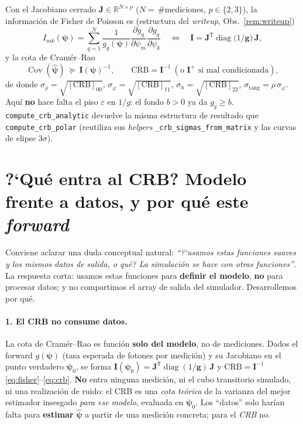 \documentclass[11pt,a4paper]{article}
\theoremstyle{plain}
\theoremstyle{definition}
\newcommand{\vect}[1]{\boldsymbol{#1}}
\newcommand{\matr}[1]{\mathbf{#1}}
\newcommand{\R}{\mathbb{R}}
\DeclareMathOperator{\diag}{diag}
\DeclareMathOperator{\Cov}{Cov}
\begin{document}
Con el Jacobiano cerrado $\matr{J}\in\R^{N\times p}$
($N=$\,\#mediciones, $p\in\{2,3\}$), la informaci\'on de Fisher de Poisson es
(estructura del \emph{writeup}, Obs.~\ref{rem:writeup})
\begin{equation}
    I_{mk}(\vect{\psi})
    =\sum_{q=1}^{N}\frac{1}{g_q(\vect{\psi})}
    \frac{\partial g_q}{\partial\psi_m}\frac{\partial g_q}{\partial\psi_k}
    \quad\Longleftrightarrow\quad
    \matr{I}=\matr{J}^{\mathsf T}\diag\!\bigl(1/\vect{g}\bigr)\,\matr{J},
    \label{eq:fisher}
\end{equation}
y la cota de Cram\'er--Rao
\begin{equation}
    \Cov(\hat{\vect{\psi}})\ \succeq\ \matr{I}(\vect{\psi})^{-1},
    \qquad
    \mathrm{CRB}=\matr{I}^{-1}\ (\text{o }\matr{I}^{+}\text{ si mal condicionada}),
    \label{eq:crb}
\end{equation}
de donde $\sigma_\rho=\sqrt{[\mathrm{CRB}]_{00}}$,
$\sigma_\varphi=\sqrt{[\mathrm{CRB}]_{11}}$,
$\sigma_h=\sqrt{[\mathrm{CRB}]_{22}}$, $\sigma_{\mathrm{tang}}=\rho\,\sigma_\varphi$.
Aqu\'i \textbf{no} hace falta el piso $\varepsilon$ en $1/g$: el fondo $b>0$ ya da
$g_q\ge b$. \texttt{compute\_crb\_analytic} devuelve la misma estructura de
resultado que \texttt{compute\_crb\_polar} (reutiliza sus \emph{helpers}
\texttt{\_crb\_sigmas\_from\_matrix} y las curvas de elipse $3\sigma$).

\section{\textup{?`}Qu\'e entra al CRB? Modelo frente a datos, y por qu\'e este \emph{forward}}
\label{sec:que-entra}

Conviene aclarar una duda conceptual natural: \emph{``\textup{?`}usamos estas
funciones suaves y los mismos datos de salida, o qu\'e? La simulaci\'on se hace
con otras funciones''}. La respuesta corta: usamos estas funciones para
\textbf{definir el modelo}, \textbf{no} para procesar datos; y no compartimos el
array de salida del simulador. Desarrollemos por qu\'e.

\paragraph{1. El CRB no consume datos.} La cota de Cram\'er--Rao es funci\'on
\textbf{solo del modelo}, no de mediciones. Dados el forward $g(\vect{\psi})$
(tasa esperada de fotones por medici\'on) y su Jacobiano en el punto verdadero
$\vect{\psi}_0$, se forma $\matr{I}(\vect{\psi}_0)=\matr J^{\mathsf
T}\diag(1/\vect g)\,\matr J$ y $\mathrm{CRB}=\matr I^{-1}$
\eqref{eq:fisher}--\eqref{eq:crb}. \textbf{No} entra ninguna medici\'on, ni el
cubo transitorio simulado, ni una realizaci\'on de ruido: el CRB es una
\emph{cota te\'orica} de la varianza del mejor estimador insesgado \emph{para ese
modelo}, evaluada en $\vect{\psi}_0$. Los ``datos'' solo har\'ian falta para
\textbf{estimar} $\hat{\vect{\psi}}$ a partir de una medici\'on concreta; para el
\emph{CRB} no.
\end{document}
